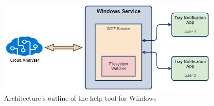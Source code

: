 \begin{figure}[H]
	\centerline{\includegraphics[scale=0.6]{figures/winService.png}}  
	\caption{Architecture's outline of the help tool for Windows}
	\label{winserviceDesign}
\end{figure}

